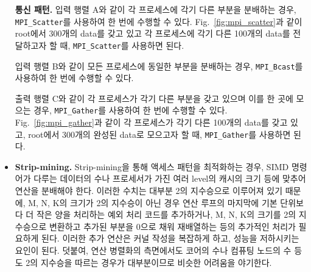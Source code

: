 \begin{itemize}
{        \textbf{통신 패턴.}
        입력 행렬 A와 같이 각 프로세스에 각기 다른 부분을 분배하는 경우, \texttt{MPI\_Scatter}를 사용하여
        한 번에 수행할 수 있다. Fig.~\ref{fig:mpi_scatter}과 같이 root에서 300개의 data를 갖고 있고
        각 프로세스에 각기 다른 100개의 data를 전달하고자 할 때, \texttt{MPI\_Scatter}를 사용하면 된다.

        입력 행렬 B와 같이 모든 프로세스에 동일한 부분을 분배하는 경우, \texttt{MPI\_Bcast}를 사용하여
        한 번에 수행할 수 있다.

        출력 행렬 C와 같이 각 프로세스가 각기 다른 부분을 갖고 있으며 이를 한 곳에 모으는 경우,
        \texttt{MPI\_Gather}를 사용하여 한 번에 수행할 수 있다. Fig.~\ref{fig:mpi_gather}과 같이
        각 프로세스가 각기 다른 100개의 data를 갖고 있고, root에서 300개의 완성된 data로 모으고자 할 때,
        \texttt{MPI\_Gather}를 사용하면 된다.

    }
    \item {
        \textbf{Strip-mining.}
        Strip-mining을 통해 액세스 패턴을 최적화하는 경우, SIMD 명령어가 다루는 데이터의 수나 프로세서가 가진
        여러 level의 캐시의 크기 등에 맞추어 연산을 분배해야 한다. 이러한 수치는 대부분 2의 지수승으로
        이루어져 있기 때문에, M, N, K의 크기가 2의 지수승이 아닌 경우 연산 루프의 마지막에 기본 단위보다
        더 작은 양을 처리하는 예외 처리 코드를 추가하거나, M, N, K의 크기를 2의 지수승으로 변환하고 추가된 부분을
        0으로 채워 재배열하는 등의 추가적인 처리가 필요하게 된다. 이러한 추가 연산은 커널 작성을 복잡하게 하고,
        성능을 저하시키는 요인이 된다. 덧붙여, 연산 병렬화의 측면에서도 코어의 수나 컴퓨팅 노드의 수 등도
        2의 지수승을 따르는 경우가 대부분이므로 비슷한 어려움을 야기한다.
    }

    
\end{itemize}